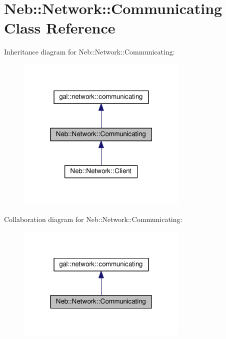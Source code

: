 \hypertarget{classNeb_1_1Network_1_1Communicating}{\section{Neb\-:\-:Network\-:\-:Communicating Class Reference}
\label{classNeb_1_1Network_1_1Communicating}
}


Inheritance diagram for Neb\-:\-:Network\-:\-:Communicating\-:
\nopagebreak
\begin{figure}[H]
\begin{center}
\leavevmode
\includegraphics[width=232pt]{classNeb_1_1Network_1_1Communicating__inherit__graph}
\end{center}
\end{figure}


Collaboration diagram for Neb\-:\-:Network\-:\-:Communicating\-:
\nopagebreak
\begin{figure}[H]
\begin{center}
\leavevmode
\includegraphics[width=232pt]{classNeb_1_1Network_1_1Communicating__coll__graph}
\end{center}
\end{figure}
